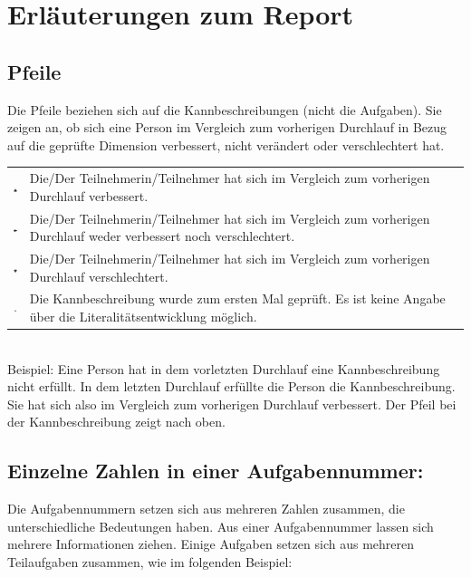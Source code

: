 \documentclass{article}
\newcommand\arrowup{\includegraphics[width=7px]{arrow_grey_up}}
\newcommand\arrowdown{\includegraphics[width=7px]{arrow_grey_down}}
\newcommand\arrowright{\includegraphics[width=7px]{arrow_grey_right}}
\newcommand\dotthorben{\includegraphics[width=7px]{dot_grey}}
\begin{document}
\thispagestyle{empty}
\NoBgThispage
{\small\section*{Erläuterungen zum Report}
\subsection*{Pfeile}
Die Pfeile beziehen sich auf die Kannbeschreibungen (nicht die Aufgaben). Sie zeigen an, ob sich eine Person im Vergleich zum vorherigen Durchlauf in Bezug auf die geprüfte Dimension verbessert, nicht verändert oder verschlechtert hat.
\vspace{.5em}\\
\begin{tabular}{cl}
\arrowup & Die/Der Teilnehmerin/Teilnehmer hat sich im Vergleich zum vorherigen Durchlauf verbessert.\\
\arrowright & Die/Der Teilnehmerin/Teilnehmer hat sich im Vergleich zum vorherigen Durchlauf weder verbessert noch verschlechtert.\\
\arrowdown & Die/Der Teilnehmerin/Teilnehmer hat sich im Vergleich zum vorherigen Durchlauf verschlechtert.\\
\dotthorben & Die Kannbeschreibung wurde zum ersten Mal geprüft. Es ist keine Angabe über die Literalitätsentwicklung möglich.\\
\end{tabular}
\vspace{.5em}\\
\noindent Beispiel: Eine Person hat in dem vorletzten Durchlauf eine Kannbeschreibung nicht erfüllt. In dem letzten Durchlauf erfüllte die Person die Kannbeschreibung. Sie hat sich also im Vergleich zum vorherigen Durchlauf verbessert. Der Pfeil bei der Kannbeschreibung zeigt nach oben.


\subsection*{Einzelne Zahlen in einer Aufgabennummer:}
Die Aufgabennummern setzen sich aus mehreren Zahlen zusammen, die unterschiedliche Bedeutungen haben. Aus einer Aufgabennummer lassen sich mehrere Informationen ziehen. Einige Aufgaben setzen sich aus mehreren Teilaufgaben zusammen, wie im folgenden Beispiel:
\vspace{0.5em}\\

}
\end{document}
